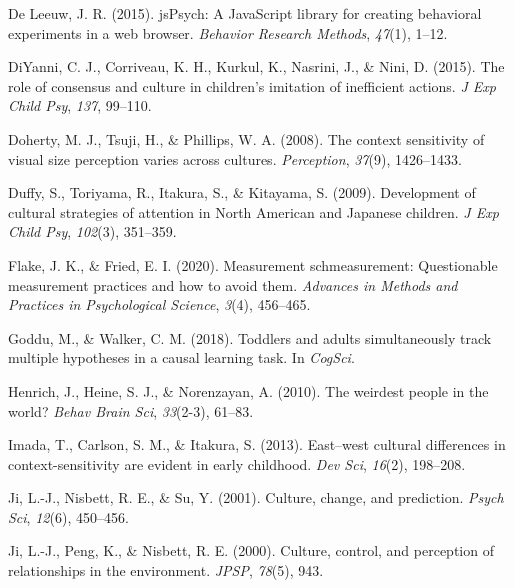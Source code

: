 \documentclass[
  man,floatsintext]{apa6}
\newlength{\cslhangindent}
\newlength{\cslentryspacingunit} %
\newenvironment{CSLReferences}[2] %
 {%
  \setlength{\parindent}{0pt}
  \ifodd #1
  \let\oldpar\par
  \def\par{\hangindent=\cslhangindent\oldpar}
  \fi
  \setlength{\parskip}{#2\cslentryspacingunit}
 }%
 {}
\begin{document}
\begin{CSLReferences}{1}{0}
\leavevmode{}%
De Leeuw, J. R. (2015). jsPsych: A JavaScript library for creating behavioral experiments in a web browser. \emph{Behavior Research Methods}, \emph{47}(1), 1--12.

\leavevmode{}%
DiYanni, C. J., Corriveau, K. H., Kurkul, K., Nasrini, J., \& Nini, D. (2015). The role of consensus and culture in children's imitation of inefficient actions. \emph{J Exp Child Psy}, \emph{137}, 99--110.

\leavevmode{}%
Doherty, M. J., Tsuji, H., \& Phillips, W. A. (2008). The context sensitivity of visual size perception varies across cultures. \emph{Perception}, \emph{37}(9), 1426--1433.

\leavevmode{}%
Duffy, S., Toriyama, R., Itakura, S., \& Kitayama, S. (2009). Development of cultural strategies of attention in {N}orth {A}merican and {J}apanese children. \emph{J Exp Child Psy}, \emph{102}(3), 351--359.

\leavevmode{}%
Flake, J. K., \& Fried, E. I. (2020). Measurement schmeasurement: Questionable measurement practices and how to avoid them. \emph{Advances in Methods and Practices in Psychological Science}, \emph{3}(4), 456--465.

\leavevmode{}%
Goddu, M., \& Walker, C. M. (2018). Toddlers and adults simultaneously track multiple hypotheses in a causal learning task. In \emph{CogSci}.

\leavevmode{}%
Henrich, J., Heine, S. J., \& Norenzayan, A. (2010). The weirdest people in the world? \emph{Behav Brain Sci}, \emph{33}(2-3), 61--83.

\leavevmode{}%
Imada, T., Carlson, S. M., \& Itakura, S. (2013). East--west cultural differences in context-sensitivity are evident in early childhood. \emph{Dev Sci}, \emph{16}(2), 198--208.

\leavevmode{}%
Ji, L.-J., Nisbett, R. E., \& Su, Y. (2001). Culture, change, and prediction. \emph{Psych Sci}, \emph{12}(6), 450--456.

\leavevmode{}%
Ji, L.-J., Peng, K., \& Nisbett, R. E. (2000). Culture, control, and perception of relationships in the environment. \emph{JPSP}, \emph{78}(5), 943.


\end{CSLReferences}
\end{document}
